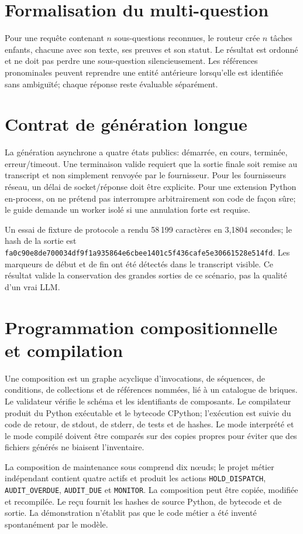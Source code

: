 \documentclass[11pt,a4paper]{article}
\begin{document}
\section{Formalisation du multi-question}
Pour une requête contenant $n$ sous-questions reconnues, le routeur crée $n$ tâches enfants, chacune avec son texte, ses preuves et son statut. Le résultat est ordonné et ne doit pas perdre une sous-question silencieusement. Les références pronominales peuvent reprendre une entité antérieure lorsqu'elle est identifiée sans ambiguïté; chaque réponse reste évaluable séparément.

\section{Contrat de génération longue}
La génération asynchrone a quatre états publics: démarrée, en cours, terminée, erreur/timeout. Une terminaison valide requiert que la sortie finale soit remise au transcript et non simplement renvoyée par le fournisseur. Pour les fournisseurs réseau, un délai de socket/réponse doit être explicite. Pour une extension Python en-process, on ne prétend pas interrompre arbitrairement son code de façon sûre; le guide demande un worker isolé si une annulation forte est requise.

Un essai de fixture de protocole a rendu 58\,199 caractères en 3,1804 secondes; le hash de la sortie est \texttt{fa0c90e8de700034df9f1a935864e6cbee1401c5f436cafe5e30661528e514fd}. Les marqueurs de début et de fin ont été détectés dans le transcript visible. Ce résultat valide la conservation des grandes sorties de ce scénario, pas la qualité d'un vrai LLM.

\section{Programmation compositionnelle et compilation}
Une composition est un graphe acyclique d'invocations, de séquences, de conditions, de collections et de références nommées, lié à un catalogue de briques. Le validateur vérifie le schéma et les identifiants de composants. Le compilateur produit du Python exécutable et le bytecode CPython; l'exécution est suivie du code de retour, de stdout, de stderr, de tests et de hashes. Le mode interprété et le mode compilé doivent être comparés sur des copies propres pour éviter que des fichiers générés ne biaisent l'inventaire.

La composition de maintenance sous  comprend dix nœuds; le projet métier indépendant contient quatre actifs et produit les actions \texttt{HOLD\_DISPATCH}, \texttt{AUDIT\_OVERDUE}, \texttt{AUDIT\_DUE} et \texttt{MONITOR}. La composition peut être copiée, modifiée et recompilée. Le reçu  fournit les hashes de source Python, de bytecode et de sortie. La démonstration n'établit pas que le code métier a été inventé spontanément par le modèle.
\end{document}
